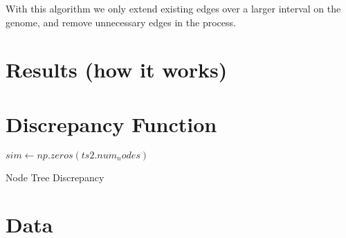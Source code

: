 \documentclass{article}
\begin{document}
With this algorithm we only extend existing edges
over a larger interval on the genome,
and remove unnecessary edges in the process.

\section{Results (how it works)}


\section{Discrepancy Function}

\begin{algorithm}[!ht]




$sim \gets np.zeros(ts2.num_nodes)$\;

\caption{Node Tree Discrepancy}\label{ndisc}
\end{algorithm}

\section{Data}



\end{document}
